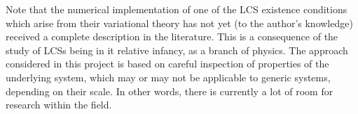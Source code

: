 Note that the numerical implementation of one of the LCS existence conditions
which arise from their variational theory has not yet (to the author's
knowledge) received a complete description in the literature. This is a
consequence of the study of LCSs being in it relative infancy, as a branch of
physics. The approach considered in this project is based on careful inspection
of properties of the underlying system, which may or may not be applicable to
generic systems, depending on their scale. In other words, there is currently a
lot of room for research within the field.
